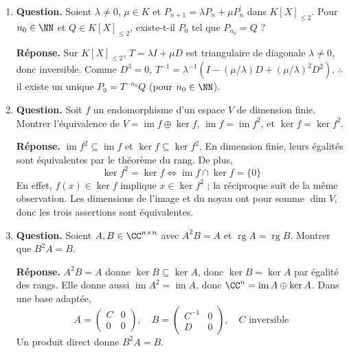 \documentclass[12pt, a4paper]{article}
\begin{document}
\begin{enumerate}[label=7.\arabic*., start=68]
  \item \begin{minipage}[t]{\linewidth}\raggedright
\textbf{Question.} Soient $\lambda\neq0$, $\mu\in K$ et $P_{n+1}=\lambda P_n+\mu P_n^{\prime}$ dans $K[X]_{\leq2}$. Pour $n_0\in\NN$ et $Q\in K[X]_{\leq2}$, existe-t-il $P_0$ tel que $P_{n_0}=Q$ ?
\par\smallskip
\textbf{Réponse.} Sur $K[X]_{\leq2}$, $T=\lambda I+\mu D$ est triangulaire de diagonale $\lambda\neq0$, donc inversible.
    Comme $D^3=0$,
    $T^{-1}=\lambda^{-1}(I-(\mu/\lambda)D+(\mu/\lambda)^2D^2)$.
    $\therefore$ il existe un unique $P_0=T^{-n_0}Q$ (pour $n_0\in\NN$).
\end{minipage}

  \item \begin{minipage}[t]{\linewidth}\raggedright
\textbf{Question.} Soit $f$ un endomorphisme d’un espace $V$ de dimension finie. Montrer l’équivalence de $V=\operatorname{im}f\oplus\ker f$, $\operatorname{im}f=\operatorname{im}f^2$, et $\ker f=\ker f^2$.
\par\smallskip
\textbf{Réponse.} $\operatorname{im}f^2\subseteq\operatorname{im}f$ et $\ker f\subseteq\ker f^2$.
    En dimension finie, leurs égalités sont équivalentes par le théorème du rang.
    De plus,
    \[
      \ker f^2=\ker f\iff\operatorname{im}f\cap\ker f=\{0\}
    \]
    En effet, $f(x)\in\ker f$ implique $x\in\ker f^2$ ; la réciproque suit de la même observation.
    Les dimensions de l'image et du noyau ont pour somme $\dim V$, donc les trois assertions sont équivalentes.
\end{minipage}

  \item \begin{minipage}[t]{\linewidth}\raggedright
\textbf{Question.} Soient $A,B\in\CC^{n\times n}$ avec $A^2B=A$ et $\operatorname{rg}A=\operatorname{rg}B$. Montrer que $B^2A=B$.
\par\smallskip
\textbf{Réponse.} $A^2B=A$ donne $\ker B\subseteq\ker A$, donc $\ker B=\ker A$ par égalité des rangs.
    Elle donne aussi $\operatorname{im}A^2=\operatorname{im}A$, donc $\CC^n=\operatorname{im}A\oplus\ker A$.
    Dans une base adaptée,
    \[
      A=\begin{pmatrix}C&0\\0&0\end{pmatrix},\quad
      B=\begin{pmatrix}C^{-1}&0\\D&0\end{pmatrix},\quad C\text{ inversible}
    \]
    Un produit direct donne $B^2A=B$.
\end{minipage}


\end{enumerate}
\end{document}
